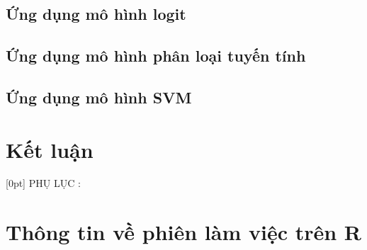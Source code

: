 \documentclass[a4paper]{report}\usepackage[]{graphicx}\usepackage[]{color}
\begin{document}
\section{Ứng dụng mô hình logit}

\section{Ứng dụng mô hình phân loại tuyến tính}

\section{Ứng dụng mô hình SVM}


\chapter{Kết luận}

\appendix
{}[0pt]{\bfseries}
  {\color{blue}PHỤ LỤC \thecontentslabel:\quad}
  {}{\contentspage}

\chapter{Thông tin về phiên làm việc trên R}
\end{document}
